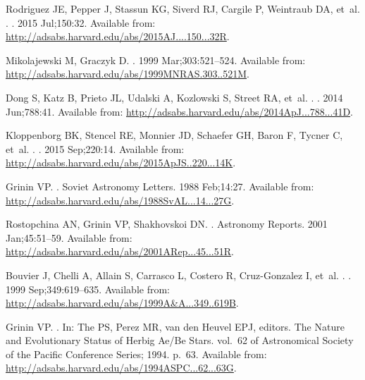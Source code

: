 \documentclass[]{rsos}
\begin{document}
\begin{thebibliography}{10}
{Rodriguez} JE, {Pepper} J, {Stassun} KG, {Siverd} RJ, {Cargile} P, {Weintraub}
  DA, et~al.
.
\newblock \aj. 2015 Jul;150:32.
\newblock Available from:
  \url{http://adsabs.harvard.edu/abs/2015AJ....150...32R}.

{Mikolajewski} M, {Graczyk} D.
\newblock \mnras. 1999 Mar;303:521--524.
\newblock Available from:
  \url{http://adsabs.harvard.edu/abs/1999MNRAS.303..521M}.

{Dong} S, {Katz} B, {Prieto} JL, {Udalski} A, {Kozlowski} S, {Street} RA,
  et~al.
.
\newblock \apj. 2014 Jun;788:41.
\newblock Available from:
  \url{http://adsabs.harvard.edu/abs/2014ApJ...788...41D}.

{Kloppenborg} BK, {Stencel} RE, {Monnier} JD, {Schaefer} GH, {Baron} F,
  {Tycner} C, et~al.
.
\newblock \apjs. 2015 Sep;220:14.
\newblock Available from:
  \url{http://adsabs.harvard.edu/abs/2015ApJS..220...14K}.

{Grinin} VP.
.
\newblock Soviet Astronomy Letters. 1988 Feb;14:27.
\newblock Available from:
  \url{http://adsabs.harvard.edu/abs/1988SvAL...14...27G}.

{Rostopchina} AN, {Grinin} VP, {Shakhovskoi} DN.
.
\newblock Astronomy Reports. 2001 Jan;45:51--59.
\newblock Available from:
  \url{http://adsabs.harvard.edu/abs/2001ARep...45...51R}.

{Bouvier} J, {Chelli} A, {Allain} S, {Carrasco} L, {Costero} R, {Cruz-Gonzalez}
  I, et~al.
.
\newblock \aap. 1999 Sep;349:619--635.
\newblock Available from:
  \url{http://adsabs.harvard.edu/abs/1999A&A...349..619B}.

{Grinin} VP.
.
\newblock In: {The} PS, {Perez} MR, {van den Heuvel} EPJ, editors. The Nature
  and Evolutionary Status of Herbig Ae/Be Stars. vol.~62 of Astronomical
  Society of the Pacific Conference Series; 1994. p.~63.
\newblock Available from:
  \url{http://adsabs.harvard.edu/abs/1994ASPC...62...63G}.


\end{thebibliography}
\end{document}

